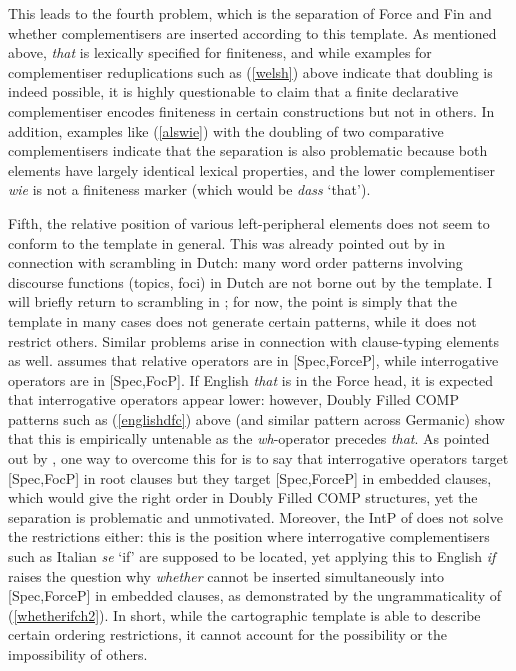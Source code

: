 This leads to the fourth problem, which is the separation of Force and Fin and whether complementisers are inserted according to this template. As mentioned above, \textit{that} is lexically specified for finiteness, and while examples for complementiser reduplications such as (\ref{welsh}) above indicate that doubling is indeed possible, it is highly questionable to claim that a finite declarative complementiser encodes finiteness in certain constructions but not in others. In addition, examples like (\ref{alswie}) with the doubling of two comparative complementisers indicate that the separation is also problematic because both elements have largely identical lexical properties, and the lower complementiser \textit{wie} is not a finiteness marker (which would be \textit{dass} `that').

Fifth, the relative position of various left-peripheral elements does not seem to conform to the template in general. This was already pointed out by \citet{neelemanvandekoot2008} in connection with scrambling in Dutch: many word order patterns involving discourse functions (topics, foci) in Dutch are not borne out by the template. I will briefly return to scrambling in ; for now, the point is simply that the template in many cases does not generate certain patterns, while it does not restrict others. Similar problems arise in connection with clause-typing elements as well. \citet{rizzi1997} assumes that relative operators are in [Spec,ForceP], while interrogative operators are in [Spec,FocP]. If English \textit{that} is in the Force head, it is expected that interrogative operators appear lower: however, Doubly Filled COMP patterns such as (\ref{englishdfc}) above (and similar pattern across Germanic) show that this is empirically untenable as the \textit{wh}-operator precedes \textit{that}. As pointed out by \citet[534--536]{sobin2002}, one way to overcome this for \citet{rizzi1997} is to say that interrogative operators target [Spec,FocP] in root clauses but they target [Spec,ForceP] in embedded clauses, which would give the right order in Doubly Filled COMP structures, yet the separation is problematic and unmotivated. Moreover, the IntP of \citet{rizzi2001, rizzi2004} does not solve the restrictions either: this is the position where interrogative complementisers such as Italian \textit{se} `if' are supposed to be located, yet applying this to English \textit{if} raises the question why \textit{whether} cannot be inserted simultaneously into [Spec,ForceP] in embedded clauses, as demonstrated by the ungrammaticality of (\ref{whetherifch2}). In short, while the cartographic template is able to describe certain ordering restrictions, it cannot account for the possibility or the impossibility of others.

